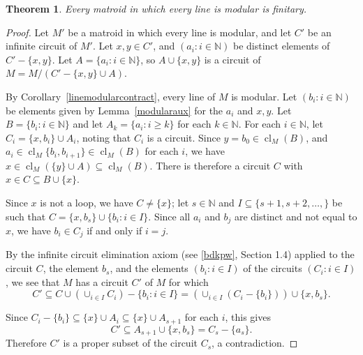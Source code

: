 \documentclass{amsart}
\theoremstyle{plain}
\newtheorem{theorem}{Theorem}[section]
\theoremstyle{definition}
\newcommand{\bN}{\mathbb N}
\DeclareMathOperator{\cl}{cl}
\newcommand{\con}{/}
\newcommand{\br}[1]{\left(#1\right)}
\renewcommand{\ge}{\geqslant}
\renewcommand{\ss}{\subseteq}
\begin{document}
\begin{theorem}\label{modularlinefinitary}
  Every matroid in which every line is modular is finitary. 
\end{theorem}
\begin{proof}
  Let $M'$ be a matroid in which every line is modular, and let $C'$ be an infinite circuit of $M'$. Let $x,y \in C'$, 
  and $(a_i : i \in \bN)$ be distinct elements of $C' - \{x,y\}$. Let $A = \{a_i : i \in \bN\}$, 
  so $A \cup \{x,y\}$ is a circuit of $M = M \con (C' - \{x,y\} \cup A)$. 
  
  By Corollary~\ref{linemodularcontract}, every line of $M$ is modular. 
  Let $(b_i : i \in \bN)$ be elements given by Lemma~\ref{modularaux} for the $a_i$ and $x,y$. Let $B = \{b_i : i \in \bN\}$ and let $A_k = \{a_i : i \ge k\}$ for each $k \in \bN$.
  For each $i \in \bN$, let $C_i = \{x, b_i\} \cup A_i$, noting that $C_i$ is a circuit. 
  Since $y = b_0 \in \cl_M(B)$, and $a_i \in \cl_M\{b_i, b_{i+1}\} \in \cl_M(B)$
  for each $i$, we have $x \in \cl_M(\{y\} \cup A) \ss \cl_M(B)$. 
  There is therefore a circuit $C$ with $x \in C \ss B \cup \{x\}$. 
  
  Since $x$ is not a loop, we have $C \ne \{x\}$; 
  let $s \in \bN$ and $I \ss \{s+1, s+2, \dotsc, \}$ be such that $C = \{x, b_s\} \cup \{b_i : i \in I\}$. 
  Since all $a_i$ and $b_j$ are distinct and not equal to $x$,
  we have $b_i \in C_j$ if and only if $i = j$. 

  By the infinite circuit elimination axiom (see \ref{bdkpw}, Section 1.4) 
  applied to the circuit $C$, 
  the element $b_s$, and the elements $(b_i : i \in I)$ 
  of the circuits $(C_i : i \in I)$, 
  we see that $M$ has a circuit $C'$ of $M$ for which
  \[C' \ss C \cup \br{\cup_{i \in I} C_i} - \{b_i : i \in I\} = \br{\cup_{i \in I} (C_i- \{b_i\})} \cup \{x, b_s\} .\] 
  
  Since $C_i - \{b_i\} \ss \{x\} \cup A_i \ss \{x\} \cup A_{s+1}$ for each $i$,
  this gives 
  \[C' \ss A_{s+1} \cup \{x, b_s\} = C_s - \{a_s\}.\] 
  Therefore $C'$ is a proper subset of the circuit $C_s$, a contradiction. 
\end{proof}
\end{document}
